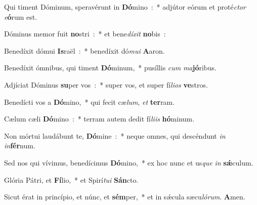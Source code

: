 \item Qui timent Dóminum, speravérunt in \textbf{Dó}\-mino~:~* adjútor eórum et proté\emph{ctor} \emph{e}\-\textbf{ó}\-rum est.
\item Dóminus memor fuit \textbf{no}\-stri~:~* et bene\emph{dí}\-\emph{xit} \textbf{no}\-bis~:
\item Benedíxit dómui \textbf{Is}\-raël~:~* benedíxit dó\emph{mu}\-\emph{i} \textbf{A}\-aron.
\item Benedíxit ómnibus, qui timent \textbf{Dó}\-minum,~* pusíllis \emph{cum} \emph{ma}\-\textbf{jó}\-ribus.
\item Adjíciat Dóminus \textbf{su}\-per vos~:~* super vos, et super fí\emph{li}\-\emph{os} \textbf{ve}\-stros.
\item Benedícti vos a \textbf{Dó}\-mino,~* qui fecit cæ\emph{lum}, \emph{et} \textbf{ter}\-ram.
\item Cælum cæli \textbf{Dó}\-mino~:~* terram autem dedit fí\emph{li}\-\emph{is} \textbf{hó}\-mi\-num.
\item Non mórtui laudábunt te, \textbf{Dó}\-mine~:~* neque omnes, qui descéndunt \emph{in} \emph{in}\-\textbf{fér}\-num.
\item Sed nos qui vívimus, benedícimus \textbf{Dó}\-mino,~* ex hoc nunc et us\emph{que} \emph{in} \textbf{sǽ}\-culum.
\item Glória Pátri, et \textbf{Fí}\-lio,~* et Spirí\emph{tu}\-\emph{i} \textbf{Sán}\-cto.
\item Sicut érat in princípio, et núnc, et \textbf{sém}\-per,~* et in sǽcula sæcu\emph{ló}\-\emph{rum}. \textbf{A}\-men.